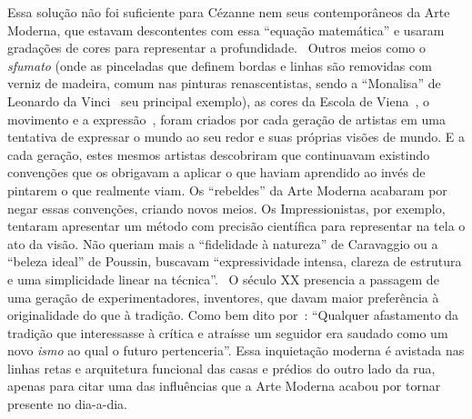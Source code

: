 Essa solução não foi suficiente para Cézanne nem seus contemporâneos
da Arte Moderna, que estavam descontentes com essa ``equação
matemática'' e usaram gradações de cores para representar a
profundidade.~\cite{sedlmayr} Outros meios como o \textit{sfumato}
(onde as pinceladas que definem bordas e linhas são removidas com
verniz de madeira, comum nas pinturas renascentistas, sendo a
``Monalisa'' de Leonardo da Vinci~\cite{pegus, hall} seu principal
exemplo), as cores da Escola de Viena~\cite{gardner}, o movimento e a
expressão~\cite{gombrich, gordon}, foram criados por cada geração de
artistas em uma tentativa de expressar o mundo ao seu redor e suas
próprias visões de mundo. E a cada geração, estes mesmos artistas
descobriram que continuavam existindo convenções que os obrigavam a
aplicar o que haviam aprendido ao invés de pintarem o que realmente
viam. Os ``rebeldes'' da Arte Moderna acabaram por negar essas
convenções, criando novos meios. Os Impressionistas, por exemplo,
tentaram apresentar um método com precisão científica para representar
na tela o ato da visão. Não queriam mais a ``fidelidade à natureza''
de Caravaggio ou a ``beleza ideal'' de Poussin, buscavam
``expressividade intensa, clareza de estrutura e uma simplicidade
linear na técnica''.~\cite{gombrich} O século XX presencia a passagem
de uma geração de experimentadores, inventores, que davam maior
preferência à originalidade do que à tradição. Como bem dito
por~\citeauthor{gombrich}: ``Qualquer afastamento da tradição que
interessasse à crítica e atraísse um seguidor era saudado como um novo
\emph{ismo} ao qual o futuro pertenceria''. Essa inquietação moderna é
avistada nas linhas retas e arquitetura funcional das casas e prédios
do outro lado da rua, apenas para citar uma das influências que a Arte
Moderna acabou por tornar presente no dia-a-dia.

